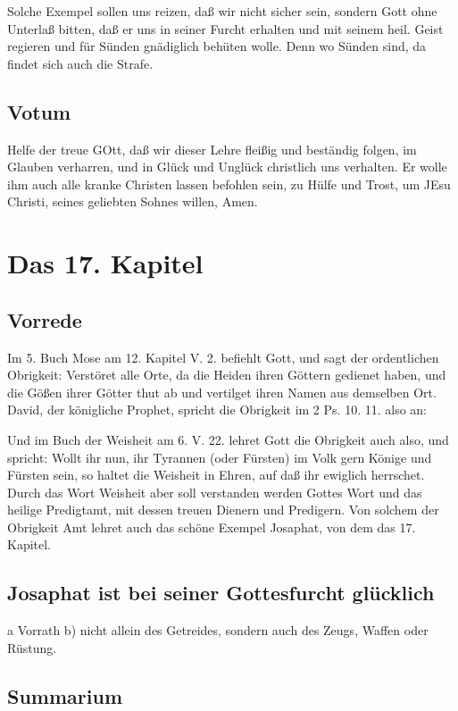 Solche Exempel sollen uns reizen, daß wir nicht sicher sein, sondern Gott ohne Unterlaß bitten, daß er uns in seiner Furcht erhalten und mit seinem heil. Geist regieren und für Sünden gnädiglich behüten wolle. Denn wo Sünden sind, da findet sich auch die Strafe.

\section{Votum}

Helfe der treue GOtt, daß wir dieser Lehre fleißig und beständig folgen, im Glauben verharren, und in Glück und Unglück christlich uns verhalten. Er wolle ihm auch alle kranke Christen lassen befohlen sein, zu Hülfe und Trost, um JEsu Christi, seines geliebten Sohnes willen, Amen.

\chapter{Das 17. Kapitel}

\section{Vorrede}

Im 5. Buch Mose am 12. Kapitel V. 2. befiehlt Gott, und sagt der ordentlichen Obrigkeit: Verstöret alle Orte, da die Heiden ihren Göttern gedienet haben, und die Gößen ihrer Götter thut ab und vertilget ihren Namen aus demselben Ort. David, der königliche Prophet, spricht die Obrigkeit im 2 Ps. 10. 11. also an:

Und im Buch der Weisheit am 6. V. 22. lehret Gott die Obrigkeit auch also, und spricht: Wollt ihr nun, ihr Tyrannen (oder Fürsten) im Volk gern Könige und Fürsten sein, so haltet die Weisheit in Ehren, auf daß ihr ewiglich herrschet. Durch das Wort Weisheit aber soll verstanden werden Gottes Wort und das heilige Predigtamt, mit dessen treuen Dienern und Predigern. Von solchem der Obrigkeit Amt lehret auch das schöne Exempel Josaphat, von dem das 17. Kapitel.

\section[Josaphat ist bei seiner Gottesfurcht glücklich]{Josaphat ist bei seiner Gottesfurcht glücklich}

a Vorrath b) nicht allein des Getreides, sondern auch des Zeugs, Waffen oder Rüstung.

\section{Summarium}

